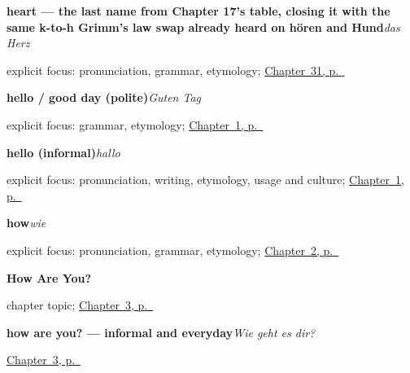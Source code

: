 \noindent\begin{minipage}[t]{\linewidth}
\raggedright
\textbf{heart — the last name from Chapter 17's table, closing it with the same k-to-h Grimm's law swap already heard on hören and Hund}\enspace\emph{das Herz}\par
\footnotesize explicit focus: pronunciation, grammar, etymology; \hyperref[ch:ge-hand-table-complete]{Chapter~31, p.~\pageref*{ch:ge-hand-table-complete}}
\end{minipage}\par\smallskip

\noindent\begin{minipage}[t]{\linewidth}
\raggedright
\textbf{hello / good day (polite)}\enspace\emph{Guten Tag}\par
\footnotesize explicit focus: grammar, etymology; \hyperref[ch:greetings]{Chapter~1, p.~\pageref*{ch:greetings}}
\end{minipage}\par\smallskip

\noindent\begin{minipage}[t]{\linewidth}
\raggedright
\textbf{hello (informal)}\enspace\emph{hallo}\par
\footnotesize explicit focus: pronunciation, writing, etymology, usage and culture; \hyperref[ch:greetings]{Chapter~1, p.~\pageref*{ch:greetings}}
\end{minipage}\par\smallskip

\noindent\begin{minipage}[t]{\linewidth}
\raggedright
\textbf{how}\enspace\emph{wie}\par
\footnotesize explicit focus: pronunciation, grammar, etymology; \hyperref[ch:introductions]{Chapter~2, p.~\pageref*{ch:introductions}}
\end{minipage}\par\smallskip

\noindent\begin{minipage}[t]{\linewidth}
\raggedright
\textbf{How Are You?}\par
\footnotesize chapter topic; \hyperref[ch:how-are-you]{Chapter~3, p.~\pageref*{ch:how-are-you}}
\end{minipage}\par\smallskip

\noindent\begin{minipage}[t]{\linewidth}
\raggedright
\textbf{how are you? — informal and everyday}\enspace\emph{Wie geht es dir?}\par
\footnotesize \hyperref[ch:how-are-you]{Chapter~3, p.~\pageref*{ch:how-are-you}}
\end{minipage}\par\smallskip

